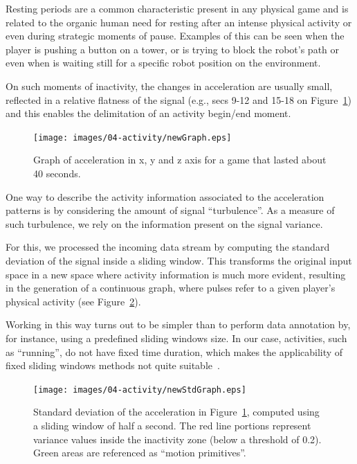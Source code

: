 Resting periods are a common characteristic present in any physical game and is related to the organic human need for resting after an intense physical activity or even during strategic moments of pause. Examples of this can be seen when the player is pushing a button on a tower, or is trying to block the robot's path or even when is waiting still for a specific robot position on the environment.

On such moments of inactivity, the changes in acceleration are usually small, reflected in a relative flatness of the signal (e.g., secs 9-12 and 15-18 on Figure~\ref{acc_graph}) and this enables the delimitation of an activity begin/end moment.

\begin{figure}[h]
      \centering
      \texttt{[image: images/04-activity/newGraph.eps]}
      \caption{Graph of acceleration in x, y and z axis for a game that lasted about 40 seconds.}
      \label{acc_graph}
\end{figure}

One way to describe the activity information associated to the acceleration patterns is by considering the amount of signal ``turbulence''. As a measure of such turbulence, we rely on the information present on the signal variance. 

For this, we processed the incoming data stream by computing the standard deviation of the signal inside a sliding window. This transforms the original input space in a new space where activity information is much more evident, resulting in the generation of a continuous graph, where pulses refer to a given player's physical activity (see Figure~\ref{fig:std_graph}).

Working in this way turns out to be simpler than to perform data annotation by, for instance, using a predefined sliding windows size. In our case, activities, such as ``running'', do not have fixed time duration, which makes the applicability of fixed sliding windows methods not quite suitable~\cite{noor_adaptive_2016}.

\begin{figure}[H]
      \centering
      \texttt{[image: images/04-activity/newStdGraph.eps]}
      \caption{Standard deviation of the acceleration in Figure~\ref{acc_graph}, computed using a sliding window of half a second. The red line portions represent variance values inside the inactivity zone (below a threshold of 0.2). Green areas are referenced as ``motion primitives''.}\label{fig:std_graph}
\end{figure}

